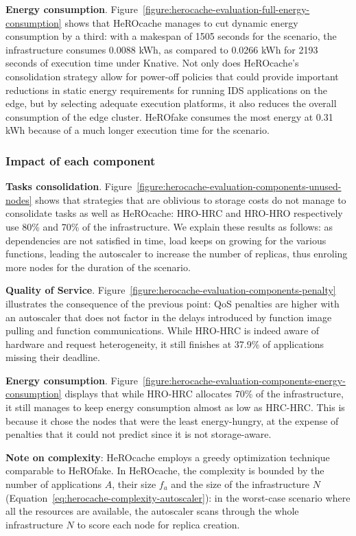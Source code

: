 \textbf{Energy consumption}. Figure~\ref{figure:herocache-evaluation-full-energy-consumption} shows that HeROcache manages to cut dynamic energy consumption by a third: with a makespan of 1505 seconds for the scenario, the infrastructure consumes 0.0088 kWh, as compared to 0.0266 kWh for 2193 seconds of execution time under Knative. Not only does HeROcache's consolidation strategy allow for power-off policies that could provide important reductions in static energy requirements for running IDS applications on the edge, but by selecting adequate execution platforms, it also reduces the overall consumption of the edge cluster. HeROfake consumes the most energy at 0.31 kWh because of a much longer execution time for the scenario.

\subsubsection{Impact of each component}

\textbf{Tasks consolidation}. Figure~\ref{figure:herocache-evaluation-components-unused-nodes} shows that strategies that are oblivious to storage costs do not manage to consolidate tasks as well as HeROcache: HRO-HRC and HRO-HRO respectively use 80\% and 70\% of the infrastructure. We explain these results as follows: as dependencies are not satisfied in time, load keeps on growing for the various functions, leading the autoscaler to increase the number of replicas, thus enroling more nodes for the duration of the scenario.%

\textbf{Quality of Service}. Figure~\ref{figure:herocache-evaluation-components-penalty} illustrates the consequence of the previous point: QoS penalties are higher with an autoscaler that does not factor in the delays introduced by function image pulling and function communications. While HRO-HRC is indeed aware of hardware and request heterogeneity, it still finishes at 37.9\% of applications missing their deadline.

\textbf{Energy consumption}. Figure~\ref{figure:herocache-evaluation-components-energy-consumption} displays that while HRO-HRC allocates 70\% of the infrastructure, it still manages to keep energy consumption almost as low as HRC-HRC. This is because it chose the nodes that were the least energy-hungry, at the expense of penalties that it could not predict since it is not storage-aware.

\textbf{Note on complexity}: HeROcache employs a greedy optimization technique comparable to HeROfake. In HeROcache, the complexity is bounded by the number of applications $A$, their size $f_{a}$ and the size of the infrastructure $N$ (Equation~\ref{eq:herocache-complexity-autoscaler}): in the worst-case scenario where all the resources are available, the autoscaler scans through the whole infrastructure $N$ to score each node for replica creation.

